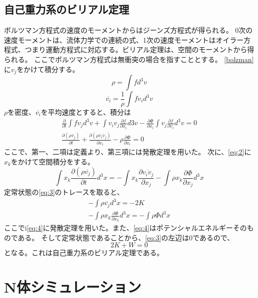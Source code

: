 \documentclass{jsarticle}
\begin{document}
\subsection {自己重力系のビリアル定理}
ボルツマン方程式の速度のモーメントからはジーンズ方程式が得られる。
0次の速度モーメントは、流体力学での連続の式、1次の速度モーメントはオイラー方程式、つまり運動方程式に対応する。ビリアル定理は、空間のモーメントから得られる。
ここでボルツマン方程式は無衝突の場合を指すこととする。
\ref{bolzman}　に$v_j$をかけて積分する。
\begin{equation}
    \rho = \int fd^3v
\end{equation}
\begin{equation}
    \overline{v_i} = \frac{1}{\rho} \int fv_id^3v
\end{equation}
$\rho$を密度、$\overline{v_i}$を平均速度とすると、積分は
\begin{align}
    \frac{\partial}{\partial t} \int fv_j d^3v + \int v_i v_j \frac{\partial f}{\partial x_i} d3v
    - \frac{\partial \Phi}{\partial x_i} \int v_j \frac{\partial f}{\partial v_i} d^3v = 0\\ 
    \frac{\partial (\rho\overline{v_j})}{\partial t} + \frac{\partial (\rho \overline{v_iv_j})}{\partial x_i} - \rho\frac{\partial \Phi}{\partial x_i} = 0 
\label{eq:2}
\end{align}
ここで、第一、二項は定義より、第三項には発散定理を用いた。
次に、\ref{eq:2}に$x_k$をかけて空間積分をする。
\begin{equation}
    \int x_k \frac{\partial (\rho\overline{v_j})}{\partial t}d^3x = 
    - \int x_k \frac{\partial \overline{v_iv_j}}{\partial x_j}
    - \int \rho x_k \frac{\partial \Phi}{\partial x_j} d^3x
\label{eq:3}
\end{equation}
定常状態の\ref{eq:3}のトレースを取ると、
\begin{align}
    - \int \rho \overline{v_j}d^3x = -2K\\
    - \int \rho x_k \frac{\partial \Phi}{\partial x_k} d^3x = - \int \rho \Phi d^3x
    \label{eq:4}
\end{align}
ここでi\ref{eq:4}に発散定理を用いた。また、\ref{eq:4}はポテンシャルエネルギーそのものである。
そして定常状態であることから、\ref{eq:3}の左辺は0であるので、
\begin{equation}
    2K + W = 0
\end{equation}
となる。これは自己重力系のビリアル定理である。

\section {N体シミュレーション}
\end{document}
